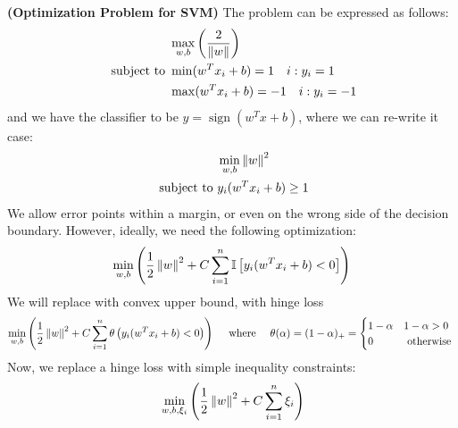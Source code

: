 \begin{definition}{\textbf{(Optimization Problem for SVM)}}
    The problem can be expressed as follows:
    \begin{equation*}
    \begin{aligned}
        &\max_{w, b}\left( \frac{2}{\left\lVert w\right\rVert} \right) \\
        \text{ subject to }&\begin{aligned}[t]
            &\min(w^Tx_i + b) = 1 \quad i:y_i=1 \\ 
            &\max(w^Tx_i + b) = -1 \quad i:y_i=-1 \\ 
        \end{aligned}
    \end{aligned}
    \end{equation*}
    and we have the classifier to be $y=\operatorname{sign}(w^Tx+b)$, where we can re-write it case:
    \begin{equation*}
    \begin{aligned}
        &\min_{w, b}\left\lVert w\right\rVert^2 \\
        \text{ subject to }&\begin{aligned}[t]
            y_i(w^Tx_i + b)\ge1
        \end{aligned} 
    \end{aligned}
    \end{equation*}
    We allow error points within a margin, or even on the wrong side of the decision boundary. However, ideally, we need the following optimization:
    \begin{equation*}
        \min_{w, b} \left( \frac{1}{2}\left\lVert w\right\rVert^2 + C\sum^n_{i=1}\mathbb{I}\left[ y_i(w^Tx_i + b) < 0 \right] \right)
    \end{equation*}
    We will replace with convex upper bound, with hinge loss 
    \begin{equation*}
        \min_{w, b} \left( \frac{1}{2}\left\lVert w\right\rVert^2 + C\sum^n_{i=1}\theta\left( y_i(w^Tx_i + b) < 0 \right) \right) \quad \text{ where } \quad \theta(\alpha) = (1-\alpha)_+ = \begin{cases}
            1-\alpha & 1-\alpha > 0 \\
            0 & \text{ otherwise }
        \end{cases}
    \end{equation*}
    Now, we replace a hinge loss with simple inequality constraints:
    \begin{equation*}
    \begin{aligned}
        &\min_{w, b,\xi_i}\bracka{\frac{1}{2}\norm{w}^2 + C\sum^n_{i=1}\xi_i}\\

\end{aligned}
\end{equation*}
\end{definition}
